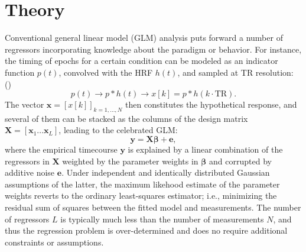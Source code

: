 
\section{Theory}


Conventional general linear model (GLM) analysis puts forward a number of regressors incorporating knowledge about the paradigm or behavior. For instance, the timing of epochs for a certain condition can be modeled as an indicator function $p(t)$, convolved with the HRF $h(t)$, and sampled at TR resolution: (\citealt{gitelman2003ModelingRegionalPsychophysiologic})
$$
   p(t) \rightarrow p*h(t) \rightarrow x[k] = p*h(k\cdot\text{TR}).
$$
The vector $\mathbf{x}=[x[k]]_{k=1,\ldots,N}$ then constitutes the hypothetical response, and several of them can be stacked as the columns of the design matrix $\mathbf{X}=[\mathbf{x}_1 \ldots \mathbf{x}_L]$, leading to the celebrated GLM: 
\begin{equation}
    \label{eq:glm}
    \mathbf{y} = \mathbf{X \beta} + \mathbf{e},
\end{equation}
where the empirical timecourse $\mathbf{y}$ is explained by a linear combination of the regressors in $\mathbf{X}$ weighted by the parameter weights in $\mathbf{\beta}$ and corrupted by additive noise $\mathbf{e}$. Under independent and identically distributed Gaussian assumptions of the latter, the maximum likehood estimate of the parameter weights reverts to the ordinary least-squares estimator; i.e., minimizing the residual sum of squares between the fitted model and measurements. The number of regressors $L$ is typically much less than the number of measurements $N$, and thus the regression problem is over-determined and does no require additional constraints or assumptions. 

